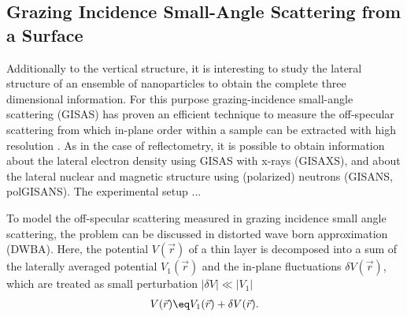 \documentclass[\main/dresen_thesis.tex]{subfiles}
\begin{document}
  \subsection{Grazing Incidence Small-Angle Scattering from a Surface}\label{sec:theoreticalBackground:scattering:GISAS}
    Additionally to the vertical structure, it is interesting to study the lateral structure of an ensemble of nanoparticles to obtain the complete three dimensional information.
    For this purpose grazing-incidence small-angle scattering (GISAS) has proven an efficient technique to measure the off-specular scattering from which in-plane order within a sample can be extracted with high resolution \cite{Renaud_2009_Probi}.
    As in the case of reflectometry, it is possible to obtain information about the lateral electron density using GISAS with x-rays (GISAXS), and about the lateral nuclear and magnetic structure using (polarized) neutrons (GISANS, polGISANS).
    The experimental setup ...

    To model the off-specular scattering measured in grazing incidence small angle scattering, the problem can be discussed in distorted wave born approximation (DWBA). Here, the potential $V(\vec{r})$ of a thin layer is decomposed into a sum of the laterally averaged potential $V_1(\vec{r})$ and the in-plane fluctuations $\delta V(\vec{r})$, which are treated as small perturbation $|\delta V| \ll |V_1|$
    \begin{align}
      V(\vec{r}) \eq V_1(\vec{r}) + \delta V(\vec{r}).
    \end{align}
\end{document}
